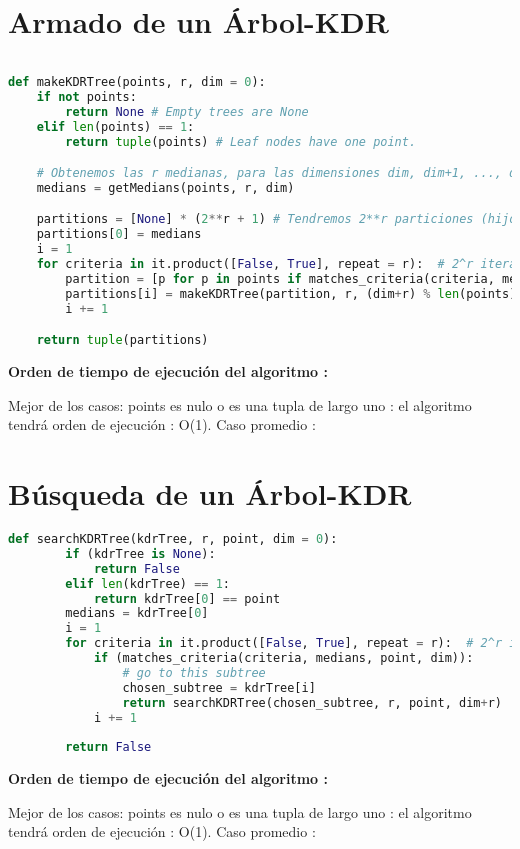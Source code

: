 
\section{Armado de un Árbol-KDR}
\begin{lstlisting}[language=Python]
	
def makeKDRTree(points, r, dim = 0):
	if not points:
		return None # Empty trees are None
	elif len(points) == 1:
		return tuple(points) # Leaf nodes have one point.

	# Obtenemos las r medianas, para las dimensiones dim, dim+1, ..., dim+(r-1)
	medians = getMedians(points, r, dim)

	partitions = [None] * (2**r + 1) # Tendremos 2**r particiones (hijos)
	partitions[0] = medians
	i = 1
	for criteria in it.product([False, True], repeat = r):  # 2^r iteraciones
		partition = [p for p in points if matches_criteria(criteria, medians, p, dim)] # n iteraciones
		partitions[i] = makeKDRTree(partition, r, (dim+r) % len(points))
		i += 1

	return tuple(partitions)
	\end{lstlisting}
\textbf{ Orden de tiempo de ejecución del algoritmo : }
{Mejor de los casos: points es nulo o es una tupla de largo uno : 
el algoritmo tendrá orden de ejecución : O(1).
Caso promedio : 



}

	\section{Búsqueda de un Árbol-KDR}
	\begin{lstlisting}[language=Python]
	def searchKDRTree(kdrTree, r, point, dim = 0):
		if (kdrTree is None):
			return False
		elif len(kdrTree) == 1:
			return kdrTree[0] == point
		medians = kdrTree[0]
		i = 1
		for criteria in it.product([False, True], repeat = r):  # 2^r iteraciones
			if (matches_criteria(criteria, medians, point, dim)):
				# go to this subtree
				chosen_subtree = kdrTree[i]
				return searchKDRTree(chosen_subtree, r, point, dim+r)
			i += 1
	
		return False
		\end{lstlisting}
	\textbf{ Orden de tiempo de ejecución del algoritmo : }
		{Mejor de los casos: points es nulo o es una tupla de largo uno : 
		el algoritmo tendrá orden de ejecución : O(1).
		Caso promedio : 
		
		
		
		}


